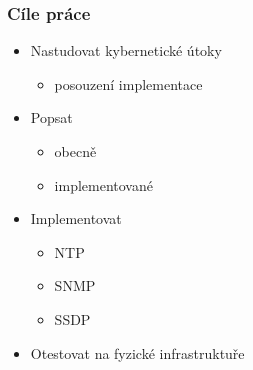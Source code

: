 \documentclass[%
12pt,       				%
t,                  %
aspectratio=1610,   %
unicode,						%
czech,              %
]{beamer}				    	%
\begin{document}
	
	\vypninavigacnisymboly
	
	\vytvortitulku
	
	
	\begin{frame} 
	\frametitle{Cíle práce}
	\begin{itemize}
		\item Nastudovat kybernetické útoky
		\begin{itemize}
			\item posouzení implementace
		\end{itemize}
		\item Popsat
		\begin{itemize}
			\item obecně
			\item implementované
		\end{itemize}
		\item Implementovat
		\begin{itemize}
			\item NTP
			\item SNMP
			\item SSDP
		\end{itemize}
		\item Otestovat na fyzické infrastruktuře
	\end{itemize}
\end{frame}

\end{document}
